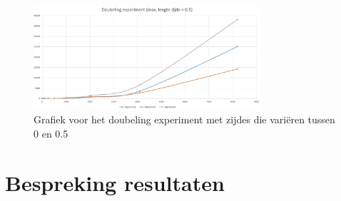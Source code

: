 \documentclass[11pt,a4paper,titlepage]{article}
\begin{document}
				\begin{figure}[H]
				\centering
				\includegraphics[width=0.75\textwidth]{zijde05.JPG}
				\caption{\label{fig:convR}Grafiek voor het doubeling experiment met zijdes die variëren tussen 0 en 0.5}
				\end{figure}
			
			
	\section{Bespreking resultaten}
	
\end{document}
